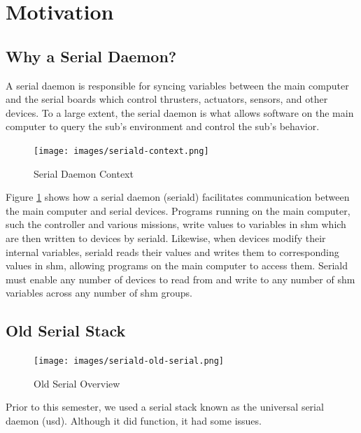 \documentclass[11pt]{article}
\let\oldsection\section
\renewcommand\section{\clearpage\oldsection}
\begin{document}
\section{Motivation}
\subsection{Why a Serial Daemon?}
A serial daemon is responsible for syncing variables between the main computer and the serial boards which control thrusters, actuators, sensors, and other devices. To a large extent, the serial daemon is what allows software on the main computer to query the sub's environment and control the sub's behavior.

\begin{figure}
    \centering
    \texttt{[image: images/seriald-context.png]}
    \caption{Serial Daemon Context}
    \label{fig:why-seriald}
\end{figure}

Figure \ref{fig:why-seriald} shows how a serial daemon (seriald) facilitates communication between the main computer and serial devices. Programs running on the main computer, such the controller and various missions, write values to variables in shm which are then written to devices by seriald. Likewise, when devices modify their internal variables, seriald reads their values and writes them to corresponding values in shm, allowing programs on the main computer to access them. Seriald must enable any number of devices to read from and write to any number of shm variables across any number of shm groups.

\subsection{Old Serial Stack}

\begin{figure}
    \centering
    \texttt{[image: images/seriald-old-serial.png]}
    \caption{Old Serial Overview}
    \label{fig:old-serial}
\end{figure}

Prior to this semester, we used a serial stack known as the universal serial daemon (usd). Although it did function, it had some issues.
\end{document}
